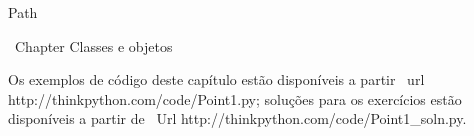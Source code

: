 \documentclass[10pt]{book}
\begin{document}
{{{{{{{{{{{%

%







Path%




\ Chapter {Classes e objetos}

Os exemplos de código deste capítulo estão disponíveis a partir
\ url {http://thinkpython.com/code/Point1.py}; soluções
para os exercícios estão disponíveis a partir de
\ Url {http://thinkpython.com/code/Point1_soln.py}.


}}}}}}}}}}}
\end{document}
